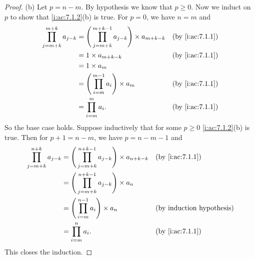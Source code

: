 \begin{proof}{(b)}
  Let \(p = n - m\).
  By hypothesis we know that \(p \geq 0\).
  Now we induct on \(p\) to show that \cref{i:ac:7.1.2}(b) is true.
  For \(p = 0\), we have \(n = m\) and
  \begin{align*}
    \prod_{j = m + k}^{m + k} a_{j - k} & = \Bigg(\prod_{j = m + k}^{m + k - 1} a_{j - k}\Bigg) \times a_{m + k - k} &  & \by{i:ac:7.1.1} \\
                                        & = 1 \times a_{m + k - k}                                                   &  & \by{i:ac:7.1.1} \\
                                        & = 1 \times a_m                                                                                  \\
                                        & = \Bigg(\prod_{i = m}^{m - 1} a_i\Bigg) \times a_m                         &  & \by{i:ac:7.1.1} \\
                                        & = \prod_{i = m}^m a_i.                                                     &  & \by{i:ac:7.1.1}
  \end{align*}
  So the base case holds.
  Suppose inductively that for some \(p \geq 0\) \cref{i:ac:7.1.2}(b) is true.
  Then for \(p + 1 = n - m\), we have \(p = n - m - 1\) and
  \begin{align*}
    \prod_{j = m + k}^{n + k} a_{j - k} & = \Bigg(\prod_{j = m + k}^{n + k - 1} a_{j - k}\Bigg) \times a_{n + k - k} &  & \by{i:ac:7.1.1} \\
                                        & = \Bigg(\prod_{j = m + k}^{n + k - 1} a_{j - k}\Bigg) \times a_n                                \\
                                        & = \Bigg(\prod_{i = m}^{n - 1} a_i\Bigg) \times a_n                         &  & \byIH           \\
                                        & = \prod_{i = m}^n a_i.                                                     &  & \by{i:ac:7.1.1}
  \end{align*}
  This closes the induction.
\end{proof}

